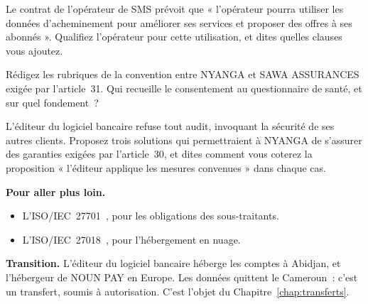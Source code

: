 \begin{boxexo}[title={\ding{45}\quad Exercice~10.2. Lire un contrat \niveaumoyen}]
Le contrat de l'opérateur de SMS prévoit que « l'opérateur pourra utiliser
les données d'acheminement pour améliorer ses services et proposer des
offres à ses abonnés ». Qualifiez l'opérateur pour cette utilisation, et
dites quelles clauses vous ajoutez.
\end{boxexo}

\begin{boxexo}[title={\ding{45}\quad Exercice~10.3. La convention publique \niveaumoyen}]
Rédigez les rubriques de la convention entre NYANGA et SAWA ASSURANCES
exigée par l'article~31. Qui recueille le consentement au questionnaire de
santé, et sur quel fondement~?
\end{boxexo}

\begin{boxexo}[title={\ding{45}\quad Exercice~10.4. Le refus d'audit \niveauexpert}]
L'éditeur du logiciel bancaire refuse tout audit, invoquant la sécurité de
ses autres clients. Proposez trois solutions qui permettraient à NYANGA de
s'assurer des garanties exigées par l'article~30, et dites comment vous
coterez la proposition « l'éditeur applique les mesures convenues » dans
chaque cas.
\end{boxexo}

\bigskip

\begin{boxinfo}
\textbf{Pour aller plus loin.}
\begin{itemize}
    \item L'ISO/IEC~27701~\cite{iso27701}, pour les obligations des
          sous-traitants.
    \item L'ISO/IEC~27018~\cite{iso27018}, pour l'hébergement en nuage.
\end{itemize}
\end{boxinfo}

\begin{boxinfo}
\textbf{Transition.} L'éditeur du logiciel bancaire héberge les comptes à
Abidjan, et l'hébergeur de NOUN PAY en Europe. Les données quittent le
Cameroun~: c'est un transfert, soumis à autorisation. C'est l'objet du
Chapitre~\ref{chap:transferts}.
\end{boxinfo}
